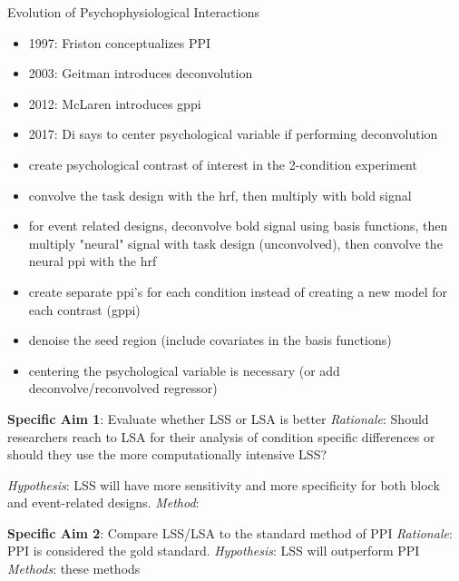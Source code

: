 \documentclass[phd,appendix,figures]{uithesis}
\begin{document}
Evolution of Psychophysiological Interactions
\begin{itemize}
	\item 1997: Friston conceptualizes PPI
	\item 2003: Geitman introduces deconvolution
	\item 2012: McLaren introduces gppi
	\item 2017: Di says to center psychological variable if performing deconvolution
	\item create psychological contrast of interest in the 2-condition experiment
	\item convolve the task design with the hrf, then multiply with bold signal
	\item for event related designs, deconvolve bold signal using basis functions,
		  then multiply "neural" signal with task design (unconvolved), then convolve
		  the neural ppi with the hrf
	\item create separate ppi's for each condition instead of creating a new model for each contrast (gppi)
	\item denoise the seed region (include covariates in the basis functions)
	\item centering the psychological variable is necessary (or add deconvolve/reconvolved regressor)
	       
\end{itemize}

\textbf{Specific Aim 1}: Evaluate whether LSS or LSA is better
\newline
\newline
\textit{Rationale}: Should researchers reach to LSA for their analysis of condition specific differences
or should they use the more computationally intensive LSS?

\textit{Hypothesis}:
LSS will have more sensitivity and more specificity for both block and event-related designs.
\newline
\newline
\textit{Method}:


\textbf{Specific Aim 2}: Compare LSS/LSA to the standard method of PPI
\newline
\newline
\textit{Rationale}: PPI is considered the gold standard.
\newline
\newline
\textit{Hypothesis}:
LSS will outperform PPI
\newline
\newline
\textit{Methods}:
these methods
\end{document}
